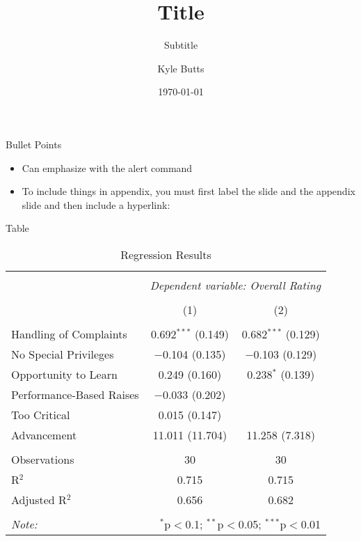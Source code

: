 \documentclass{beamer}
\title{Title}
\subtitle{Subtitle}
\date{\today}
\author{Kyle Butts}
\begin{document}
\maketitle

\begin{frame}{Bullet Points}\label{main1}
    \begin{itemize}
        \item Can emphasize with \alert{the alert command}
        
        \item To include things in appendix, you must first label the slide and the appendix slide and then include a hyperlink:
        
        \hyperlink{appendix1}{}
    \end{itemize}
\end{frame}




\begin{frame}{Table}
    
    {\fontsize{8}{10}\selectfont 
        
        \begin{table}[!htbp] \centering 
            \caption{Regression Results} 
            \label{}
            
            \begin{tabular}{@{\extracolsep{5pt}}lcc} 
            \hline 
            \hline \\[-1.8ex] 
            & \multicolumn{2}{c}{\textit{Dependent variable: Overall Rating}} \\ 
            \cline{2-3} 
            \\[-1.8ex] & (1) & (2)\\ 
            \hline \\[-1.8ex] 
            Handling of Complaints & 0.692$^{***}$ (0.149) & 0.682$^{***}$ (0.129) \\ 
            No Special Privileges & $-$0.104 (0.135) & $-$0.103 (0.129) \\ 
            Opportunity to Learn & 0.249 (0.160) & 0.238$^{*}$ (0.139) \\ 
            Performance-Based Raises & $-$0.033 (0.202) &  \\ 
            Too Critical & 0.015 (0.147) &  \\ 
            Advancement & 11.011 (11.704) & 11.258 (7.318) \\ 
            \hline \\[-1.8ex] 
            Observations & 30 & 30 \\ 
            R$^{2}$ & 0.715 & 0.715 \\ 
            Adjusted R$^{2}$ & 0.656 & 0.682 \\ 
            \hline 
            \hline \\[-1.8ex] 
            \textit{Note:}  & \multicolumn{2}{r}{$^{*}$p$<$0.1; $^{**}$p$<$0.05; $^{***}$p$<$0.01} \\ 
            \end{tabular} 
        \end{table}
    }
    
\end{frame}
\end{document}
